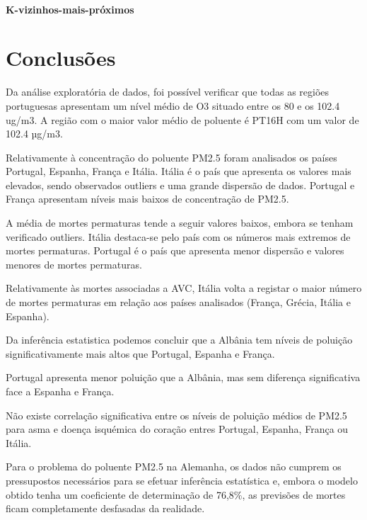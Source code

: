 \documentclass[conference]{IEEEtran}
\begin{document}
\medskip

\paragraph{K-vizinhos-mais-próximos}




\section*{Conclusões}

Da análise exploratória de dados, foi possível verificar que todas as regiões portuguesas apresentam um nível médio de O3 situado entre os 80 e os 102.4 ug/m3. A região com o maior valor médio de poluente é PT16H com um valor de 102.4 µg/m3.

Relativamente à concentração do poluente PM2.5 foram analisados os países Portugal, Espanha, França e Itália. Itália é o país que apresenta os valores mais elevados, sendo observados outliers e uma grande dispersão de dados. Portugal e França apresentam níveis mais baixos de concentração de PM2.5.

A média de mortes permaturas tende a seguir valores baixos, embora se tenham verificado outliers. Itália destaca-se pelo país com os números mais extremos de mortes permaturas. Portugal é o país que apresenta menor dispersão e valores menores de mortes permaturas.

Relativamente às mortes associadas a AVC, Itália volta a registar o maior número de mortes permaturas em relação aos países analisados (França, Grécia, Itália e Espanha).

Da inferência estatistica podemos concluir que a Albânia tem níveis de poluição significativamente mais altos que Portugal, Espanha e França.

Portugal apresenta menor poluição que a Albânia, mas sem diferença significativa face a Espanha e França.

Não existe correlação significativa entre os níveis de poluição médios de PM2.5 para asma e doença isquémica do coração entres Portugal, Espanha, França ou Itália.

Para o problema do poluente PM2.5 na Alemanha, os dados não cumprem os pressupostos necessários para se efetuar inferência estatística e, embora o modelo obtido tenha um coeficiente de determinação de 76,8\%, as previsões de mortes ficam completamente desfasadas da realidade.
\end{document}
